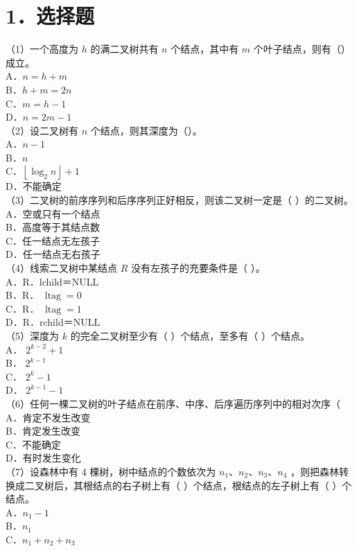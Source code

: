 \documentclass[10pt]{article}
\begin{document}
\section*{1．选择题}
（1）一个高度为 $h$ 的满二叉树共有 $n$ 个结点，其中有 $m$ 个叶子结点，则有（）成立。\\
A．$n=h+m$\\
B．$h+m=2 n$\\
C．$m=h-1$\\
D．$n=2 m-1$\\
（2）设二叉树有 $n$ 个结点，则其深度为（）。\\
A．$n-1$\\
B．$n$\\
C．$\left\lfloor\log _{2} n\right\rfloor+1$\\
D．不能确定\\
（3）二叉树的前序序列和后序序列正好相反，则该二叉树一定是（ ）的二叉树。\\
A．空或只有一个结点\\
B．高度等于其结点数\\
C．任一结点无左孩子\\
D．任一结点无右孩子\\
（4）线索二叉树中某结点 $R$ 没有左孩子的充要条件是（ ）。\\
A．R．lchild＝NULL\\
B．R． $\operatorname{ltag}=0$\\
C．R． $\operatorname{ltag}=1$\\
D．R．rchild＝NULL\\
（5）深度为 $k$ 的完全二叉树至少有（ ）个结点，至多有（ ）个结点。\\
A． $2^{k-2}+1$\\
B． $2^{k-1}$\\
C． $2^{k}-1$\\
D． $2^{k-1}-1$\\
（6）任何一棵二叉树的叶子结点在前序、中序、后序遍历序列中的相对次序（\\
A．肯定不发生改变\\
B．肯定发生改变\\
C．不能确定\\
D．有时发生变化\\
（7）设森林中有 4 棵树，树中结点的个数依次为 $n_{1} 、 n_{2} 、 n_{3} 、 n_{4}$ ，则把森林转换成二叉树后，其根结点的右子树上有（ ）个结点，根结点的左子树上有（ ）个结点。\\
A．$n_{1}-1$\\
B．$n_{1}$\\
C．$n_{1}+n_{2}+n_{3}$\\
\end{document}
